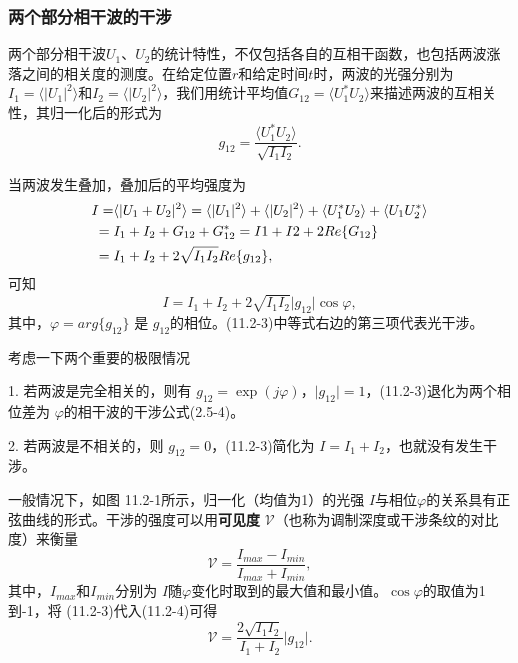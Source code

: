\documentclass[UTF8]{ctexart}
\numberwithin{figure}{subsection}
\numberwithin{table}{subsection}
\begin{document}
\subsubsection{两个部分相干波的干涉}
\endgroup
两个部分相干波$ U_1 $、$ U_2 $的统计特性，不仅包括各自的互相干函数，也包括两波涨落之间的相关度的测度。在给定位置$ r $和给定时间$ t $时，两波的光强分别为$ I_1 = \langle \lvert U_1 \rvert ^2 \rangle $和$ I_2 = \langle \lvert U_2 \rvert ^2 \rangle $，我们用统计平均值$ G_{12} = \langle U_1^\ast U_2 \rangle $来描述两波的互相关性，其归一化后的形式为
\begin{equation}
g_{12} = \frac{\langle U_1^\ast U_2 \rangle}{\sqrt{I_1 I_2}} .
\end{equation}
\par 当两波发生叠加，叠加后的平均强度为
\begin{align}
I = & \langle \lvert U_1 + U_2 \rvert ^2 \rangle = \langle \lvert U_1 \rvert ^2 \rangle + \langle \lvert U_2 \rvert ^2 \rangle + \langle U_1^\ast U_2 \rangle + \langle U_1 U_2^\ast \rangle \notag \\
={} & I_1 + I_2 + G_{12} + G_{12}^\ast = I1 + I2 + 2 Re\{ G_{12} \} \notag \\
={} & I_1 + I_2 + 2\sqrt{I_1 I_2}Re\{ g_{12} \},
\end{align}
可知
\begin{equation}
I = I_1 + I_2 + 2\sqrt{I_1 I_2} \lvert g_{12} \rvert \cos \varphi ,
\end{equation}
其中，$ \varphi = arg\{ g_{12} \} $ 是 $ g_{12} $的相位。(11.2-3)中等式右边的第三项代表光干涉。 
\par 考虑一下两个重要的极限情况
\bigbreak\par 1. 若两波是完全相关的，则有 $ g_{12} = \exp (j\varphi) $，$ \lvert g_{12} \rvert = 1 $，(11.2-3)退化为两个相位差为 $ \varphi $的相干波的干涉公式(2.5-4)。
\bigbreak\par 2. 若两波是不相关的，则 $ g_{12} = 0 $，(11.2-3)简化为 $ I = I_1 + I_2 $，也就没有发生干涉。
\bigbreak\par 一般情况下，如图 11.2-1所示，归一化（均值为1）的光强 $ I $与相位$ \varphi $的关系具有正弦曲线的形式。干涉的强度可以用\textbf{可见度} $ \mathcal{V} $（也称为调制深度或干涉条纹的对比度）来衡量
\begin{equation}
\mathcal{V} = \frac{I_{max} - I_{min}}{I_{max} + I_{min}},
\end{equation}
其中，$ I_{max} $和$ I_{min} $分别为 $ I $随$ \varphi $变化时取到的最大值和最小值。$ \cos \varphi $的取值为1到-1，将 (11.2-3)代入(11.2-4)可得
\begin{equation}
\mathcal{V} = \frac{2\sqrt{I_1 I_2}}{I_1 + I_2} \lvert g_{12} \rvert .
\end{equation}
\end{document}
